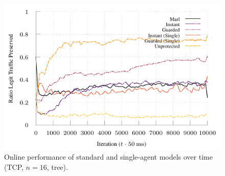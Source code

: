 \documentclass[10pt, times, conference, letterpaper]{IEEEtran}
\begin{document}
\begin{figure}
	\centering
	\includegraphics[width=0.75\linewidth]{../plots/tnsm-tcp-16-single}
	\vspace{-1em}
	\caption{
		Online performance of standard and single-agent models over time (TCP, $n=16$, tree).
		\label{fig:tcp-tree-16}
	}
\vspace{-1em}
\end{figure}

%	

%	

%	
\end{document}
